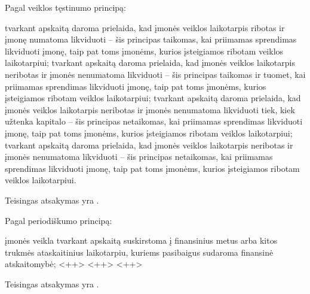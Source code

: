 \begin{tasks}
  \begin{task}
    \begin{condition}
      Pagal veiklos tęstinumo principą:
      \begin{enumerate}
         tvarkant apskaitą daroma prielaida, kad įmonės
          veiklos laikotarpis ribotas ir įmonę numatoma likviduoti –
          šis principas taikomas, kai priimamas sprendimas likviduoti
          įmonę, taip pat toms įmonėms, kurios įsteigiamos ribotam
          veiklos laikotarpiui;
         tvarkant apskaitą daroma prielaida, kad įmonės veiklos
          laikotarpis neribotas ir įmonės nenumatoma likviduoti –
          šis principas taikomas ir tuomet, kai priimamas sprendimas
          likviduoti įmonę, taip pat toms įmonėms, kurios įsteigiamos
          ribotam veiklos laikotarpiui;
         tvarkant apskaitą daroma prielaida, kad įmonės
          veiklos laikotarpis neribotas ir įmonės nenumatoma
          likviduoti tiek, kiek užtenka kapitalo – šis principas
          netaikomas, kai priimamas sprendimas likviduoti įmonę,
          taip pat toms įmonėms, kurios įsteigiamos ribotam veiklos
          laikotarpiui;
         tvarkant apskaitą daroma prielaida, kad įmonės
          veiklos laikotarpis neribotas ir įmonės nenumatoma
          likviduoti – šis principas netaikomas, kai priimamas
          sprendimas likviduoti įmonę, taip pat toms įmonėms, kurios
          įsteigiamos ribotam veiklos laikotarpiui.
      \end{enumerate}
    \end{condition}
    \begin{solution}
      Teisingas atsakymas yra .
    \end{solution}
  \end{task}

  \begin{task}
    \begin{condition}
      Pagal periodiškumo principą:
      \begin{enumerate}
         įmonės veikla tvarkant apskaitą suskirstoma į
          finansinius metus arba kitos trukmės ataskaitinius
          laikotarpiu, kuriems pasibaigus sudaroma finansinė
          atskaitomybė;
         <++>
         <++>
         <++>
      \end{enumerate}
    \end{condition}
    \begin{solution}
      Teisingas atsakymas yra .
    \end{solution}
  \end{task}


\end{tasks}

